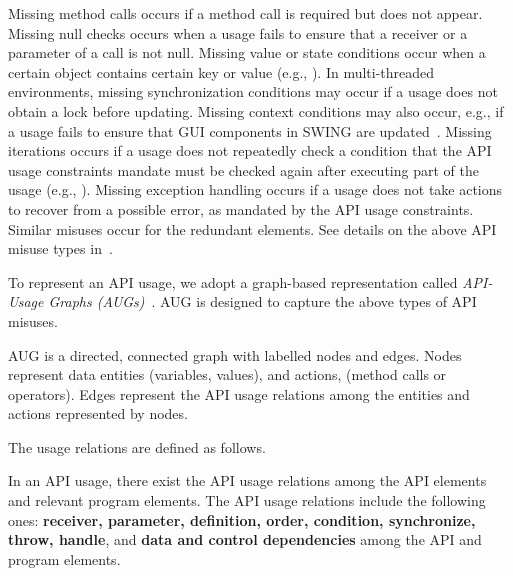Missing method calls occurs if a method call is required but does
not appear. Missing null checks occurs when a usage fails to ensure
that a receiver or a parameter of a call is not null. Missing value or
state conditions occur when a certain object contains certain key or
value (e.g., ). In multi-threaded environments, missing
synchronization conditions may occur if a usage does not obtain a lock
before updating. Missing context conditions may also occur, e.g., if a
usage fails to ensure that GUI components in SWING are
updated~\cite{msr19}. Missing iterations occurs if a usage does not
repeatedly check a condition that the API usage constraints mandate
must be checked again after executing part of the usage (e.g.,
). Missing exception handling occurs if a usage does not
take actions to recover from a possible error, as mandated by the API
usage constraints. Similar misuses occur for the redundant
elements. See details on the above API misuse types in~\cite{msr19}.

To represent an API usage, we adopt a graph-based representation
called {\em API-Usage Graphs (AUGs)}~\cite{msr19}. AUG is designed
to capture the above types of API misuses.

\begin{Definition}
AUG is a directed, connected graph with labelled nodes and
edges. Nodes represent data entities (variables, values), and actions,
(method calls or operators). Edges represent the API usage
relations among the entities and actions represented by nodes.
\end{Definition}

The usage relations are defined as follows.

\begin{Definition}
  In an API usage, there exist the API usage relations among the API
  elements and relevant program elements. The API usage relations
  include the following ones: {\bf receiver, parameter, definition,
    order, condition, synchronize, throw, handle}, and {\bf data and
    control dependencies} among the API and program elements.
\end{Definition}

